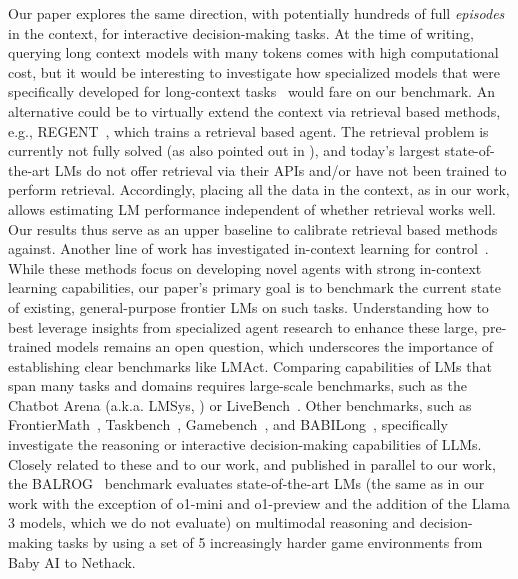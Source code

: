 \documentclass{article}
\newcommand{\eg}{e.g., }
\newcommand{\mini}{o1-mini}
\newcommand{\preview}{o1-preview}
\begin{document}
Our paper explores the same direction, with potentially hundreds of full \emph{episodes} in the context, for interactive decision-making tasks.
At the time of writing, querying long context models with many tokens comes with high computational cost, but it would be interesting to investigate how specialized models that were specifically developed for long-context tasks~\citep{bulatov2022recurrent, cherepanov2024recurrent} would fare on our benchmark.
An alternative could be to virtually extend the context via retrieval based methods, \eg REGENT~\citep{sridhar2024regent}, which trains a retrieval based agent.
The retrieval problem is currently not fully solved (as also pointed out in \citet{paglieri2025balrog}), and today's largest state-of-the-art LMs do not offer retrieval via their APIs and/or have not been trained to perform retrieval.
Accordingly, placing all the data in the context, as in our work, allows estimating LM performance independent of whether retrieval works well.
Our results thus serve as an upper baseline to calibrate retrieval based methods against.
Another line of work has investigated in-context learning for control~\citep{duan2017oneshot, xu2022prompting, fu2024incontext, fang2024moka, yin2024incontext, wang2024prompt}.
While these methods focus on developing novel agents with strong in-context learning capabilities, our paper's primary goal is to benchmark the current state of existing, general-purpose frontier LMs on such tasks.
Understanding how to best leverage insights from specialized agent research to enhance these large, pre-trained models remains an open question, which underscores the importance of establishing clear benchmarks like LMAct.
Comparing capabilities of LMs that span many tasks and domains requires large-scale benchmarks, such as the Chatbot Arena (a.k.a. LMSys, \citet{chiang2024chatbot}) or LiveBench~\citep{white2025livebench}.
Other benchmarks, such as FrontierMath~\citep{glazer2024frontiermath}, Taskbench~\citep{shen2024taskbench}, Gamebench~\citep{costarelli2024gamebench}, and BABILong~\citep{kuratov2024babilong}, specifically investigate the reasoning or interactive decision-making capabilities of LLMs.
Closely related to these and to our work, and published in parallel to our work, the BALROG~\citep{paglieri2025balrog} benchmark evaluates state-of-the-art LMs (the same as in our work with the exception of \mini{} and \preview{} and the addition of the Llama 3 models, which we do not evaluate) on multimodal reasoning and decision-making tasks by using a set of 5 increasingly harder game environments from Baby AI to Nethack.
\end{document}

